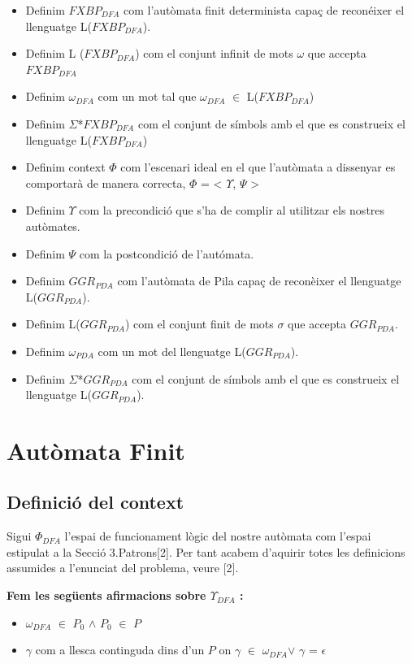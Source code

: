 \documentclass[12pt,a4paper]{report}
\def \w{$\omega$}
\def \dfa{$FXBP_{DFA} $}
\def \alphabetDFA{$\Sigma$*\dfa}
\def \alphabetPDA{$\Sigma$*\pda}
\def \wdfa{$\omega_{DFA} $}
\def \wpda{$\omega_{PDA} $}
\def \pda{$GGR_{PDA} $}
\def \context{$\Phi$}
\def \contextDFA{$\Phi_{DFA}$}
\def \pre{$\Upsilon$}
\def \preDFA{$\Upsilon_{DFA}$}
\def \post{$\Psi$}
\def \llesca{$\gamma$}
\begin{document}
\begin{itemize}
\item Definim \dfa{} com l’autòmata finit determinista capaç de reconéixer el llenguatge L(\dfa{}).
\item Definim L (\dfa{}) com el conjunt infinit de mots \w{} que accepta \dfa{}
\item Definim \wdfa{} com un mot tal que \wdfa{} $\in$ L(\dfa{})
\item Definim \alphabetDFA{} com el conjunt de símbols amb el que es construeix el llenguatge L(\dfa{})
\item Definim context \context{} com l’escenari ideal en el que l’autòmata a dissenyar es comportarà de manera correcta, \context{} = < \pre{}, \post{} >
\item Definim \pre{} com la precondició que s'ha de complir al utilitzar els nostres autòmates.
\item Definim \post{} com la postcondició de l'autómata.
\item Definim \pda{} com l'autòmata de Pila capaç de reconèixer el llenguatge L(\pda{}).
\item Definim L(\pda{}) com el conjunt finit de mots $\sigma$ que accepta \pda{}.
\item Definim \wpda{} com un mot del llenguatge L(\pda{}).
\item Definim \alphabetPDA{} com el conjunt de símbols amb el que es construeix el llenguatge L(\pda).

\end{itemize}

\chapter{Autòmata Finit}

\section{Definició del context}

Sigui \contextDFA{} l'espai de funcionament lògic del nostre autòmata com l'espai estipulat a la Secció 3.Patrons[2]. Per tant acabem d'aquirir totes les definicions assumides a l'enunciat del problema, veure [2].

\textbf{Fem les següents afirmacions sobre \preDFA{} :}
\begin{itemize}
\item \wdfa{} $\in$ $P_0$ $\wedge$ $P_0$ $\in$ $P$
\item \llesca{} com a llesca continguda dins d'un $P$ on \llesca{} $\in$ \wdfa $\vee$ \llesca{} = $\epsilon$
\end{itemize}
\end{document}
